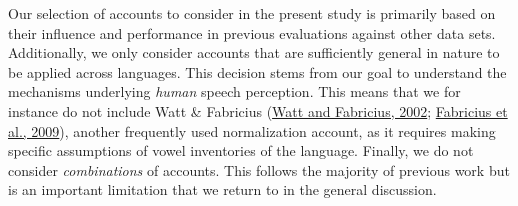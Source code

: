 \documentclass[utf8]{frontiersSCNS}
\begin{document}
Our selection of accounts to consider in the present study is primarily based on their influence and performance in previous evaluations against other data sets. Additionally, we only consider accounts that are sufficiently general in nature to be applied across languages. This decision stems from our goal to understand the mechanisms underlying \emph{human} speech perception. This means that we for instance do not include Watt \& Fabricius (\protect\hyperlink{ref-watt2002}{Watt and Fabricius, 2002}; \protect\hyperlink{ref-fabricius2009}{Fabricius et al., 2009}), another frequently used normalization account, as it requires making specific assumptions of vowel inventories of the language. Finally, we do not consider \emph{combinations} of accounts. This follows the majority of previous work but is an important limitation that we return to in the general discussion.
\end{document}
